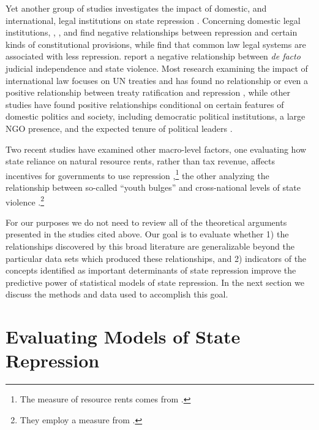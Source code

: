 \documentclass[12pt]{article}
\begin{document}
Yet another group of studies investigates the impact of domestic, and international, legal institutions on state repression \citep{Davenport1996JOP,Cross1999,Hathaway2002,HafnerBurton2005io,Neumayer2005,KeithTatePoe2009,Simmons2009, PowellStaton2009,Hill2010,Lupu2011,Mitchell2013}. Concerning domestic legal institutions, \citet{Davenport1996JOP}, \citet{Cross1999}, and \citet{KeithTatePoe2009} find negative relationships between repression and certain kinds of constitutional provisions, while \citet{Mitchell2013} find that common law legal systems are associated with less repression. \citet{PowellStaton2009} report a negative relationship between {\it de facto} judicial independence and state violence. Most research examining the impact of international law focuses on UN treaties and has found no relationship or even a positive relationship between treaty ratification and repression \citep{Keith1999,Hathaway2002,Hill2010}, while other studies have found positive relationships conditional on certain features of domestic politics and society, including democratic political institutions, a large NGO presence, and the expected tenure of political leaders \citep{Neumayer2005,Simmons2009,ConradRitter2013}. 

Two recent studies have examined other macro-level factors, one evaluating how state reliance on natural resource rents, rather than tax revenue, affects incentives for governments to use repression \citep{DemerittYoung2013},\footnote{The measure of resource rents comes from \citet{Ross2006}.} the other analyzing the relationship between so-called ``youth bulges'' and cross-national levels of state violence \citep{NordaasDavenport2013}.\footnote{They employ a measure from \citet{Urdal2006}.} 

For our purposes we do not need to review all of the theoretical arguments presented in the studies cited above. Our goal is to evaluate whether 1) the relationships discovered by this broad literature are generalizable beyond the particular data sets which produced these relationships, and 2) indicators of the concepts identified as important determinants of state repression improve the predictive power of statistical models of state repression. In the next section we discuss the methods and data used to accomplish this goal.

\section{Evaluating Models of State Repression}
 
\end{document}
